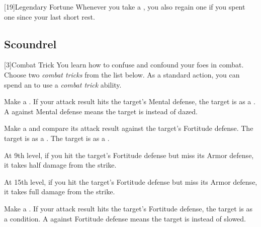         [19]{Legendary Fortune} Whenever you take a , you also regain one  if you spent one since your last short rest.

    \subsection{Scoundrel}

        [3]{Combat Trick}
        You learn how to confuse and confound your foes in combat.
        Choose two \textit{combat tricks} from the list below.
        As a standard action, you can spend an  to use a \textit{combat trick} ability.
        {
             Make a .
            If your attack result hits the target's Mental defense, the target is \dazed as a .
            A  against Mental defense means the target is \stunned instead of dazed.

             Make a  and compare its attack result against the target's Fortitude defense.
             The target is \sickened as a .
             The target is \nauseated as a .

            At 9th level, if you hit the target's Fortitude defense but miss its Armor defense, it takes half damage from the strike.
            \par At 15th level, if you hit the target's Fortitude defense but miss its Armor defense, it takes full damage from the strike.

             Make a .
            If your attack result hits the target's Fortitude defense, the target is \slowed as a condition.
            A  against Fortitude defense means the target is \immobilized instead of slowed.
        }




